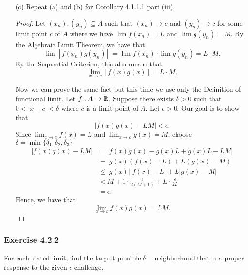 \begin{enumerate}
\begin{proof}
\begin{align*}
       &< \frac{ \epsilon  }{ 2  }  + \frac{ \epsilon  }{ 2 } \\
       &= \epsilon.
    \end{align*}
    Hence, we have 
    \[  \lim_{ x \to c } [f(x) + g(x)] = L + M.  \]
    \end{proof}
    \item[(c)] Repeat (a) and (b) for Corollary 4.1.1.1 part (iii).
    \begin{proof}
    Let \( (x_n), (y_n) \subseteq A  \) such that \( (x_n) \to c  \) and \( (y_n) \to c  \) for some limit point \( c  \) of \( A  \) where  we have 
    \( \lim f(x_n) = L   \) and \( \lim  g(y_n) = M  \). By the Algebraic Limit Theorem, we have that 
    \[ \lim [f(x_n)g(y_n)] = \lim f(x_n) \cdot \lim g(y_n) = L \cdot M. \]
   By the Sequential Criterion, this also means that 
   \[  \lim_{ x \to c } [f(x)g(x)] = L \cdot M. \]

    Now we can prove the same fact but this time we use only the Definition of functional limit.
    Let \( f: A \to \mathbb{R}  \). Suppose there exists \( \delta > 0  \) such that \( 0 < | x - c  | < \delta  \) where \( c  \) is a limit point of \( A  \). Let \( \epsilon > 0  \). Our goal is to show that 
    \[ | f(x)g(x) - LM  | < \epsilon. \]
    Since \( \lim_{ x \to c } f(x) = L  \) and \( \lim_{ x  \to c } g(x) = M  \), choose \( \delta = \min \{  \delta_1, \delta_2, \delta_3  \}  \) 
    \begin{align*}
        | f(x)g(x) - LM  | &= | f(x)g(x) - g(x)L + g(x)L - LM |  \\
                           &= | g(x)(f(x) - L ) + L (g(x) - M)  | \\ 
                           &\leq | g(x) | | f(x) - L  | + L | g(x) - M  |   \\
                           &< M + 1 \cdot \frac{ \epsilon  }{ 2(M + 1)  } + L \cdot \frac{ \epsilon  }{ 2L  } \\
                           &= \epsilon.
    \end{align*}
    Hence, we have that 
    \[  \lim_{ x \to c } f(x)g(x) = L M. \]
    \end{proof}
\end{enumerate}


\subsubsection{Exercise 4.2.2} For each stated limit, find the largest possible \( \delta- \)neighborhood that is a proper response to the given \( \epsilon  \) challenge.


